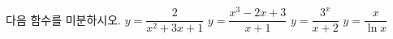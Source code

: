 다음 함수를 미분하시오.
 $y=\dfrac{2}{x^2+3x+1}$
 $y=\dfrac{x^3-2x+3}{x+1}$
 $y=\dfrac{3^x}{x+2}$
 $y=\dfrac{x}{\ln x}$
